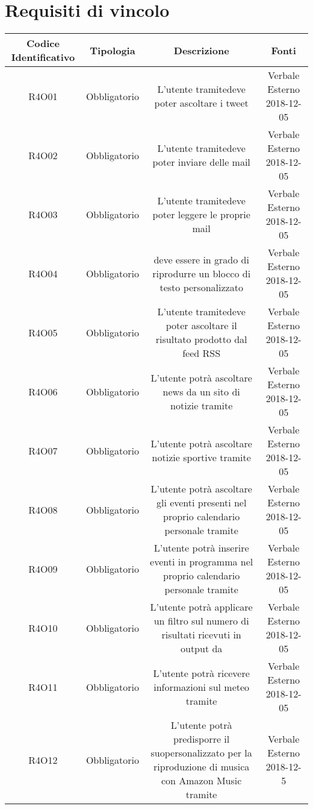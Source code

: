 \section{Requisiti di vincolo}
\begin{tabularx}{\textwidth}{|C|C|C|C|}
	\hline
	\textbf{Codice Identificativo}& \textbf{Tipologia} & \textbf{Descrizione} & \textbf{Fonti}\\
	\hline	
	\endhead
	R4O01&Obbligatorio  &L'utente tramitedeve poter ascoltare i tweet & Verbale Esterno 2018-12-05 \\
	\hline
	R4O02&Obbligatorio  &L'utente tramitedeve poter inviare delle mail & Verbale Esterno 2018-12-05 \\
	\hline
	R4O03&Obbligatorio  &L'utente tramitedeve poter leggere le proprie mail & Verbale Esterno 2018-12-05 \\
	\hline
	R4O04&Obbligatorio  & deve essere in grado di riprodurre un blocco di testo personalizzato & Verbale Esterno 2018-12-05 \\
	\hline
	R4O05&Obbligatorio  &L'utente tramitedeve poter ascoltare il risultato prodotto dal feed RSS & Verbale Esterno 2018-12-05 \\
	\hline
	R4O06 &Obbligatorio& L'utente potrà ascoltare news da un sito di notizie tramite &Verbale Esterno 2018-12-05\\
	\hline
	R4O07 &Obbligatorio& L'utente potrà ascoltare notizie sportive tramite &Verbale Esterno 2018-12-05\\
	\hline
	R4O08 &Obbligatorio&L'utente potrà ascoltare gli eventi presenti nel proprio calendario personale tramite  &Verbale Esterno 2018-12-05\\
	\hline
	R4O09 &Obbligatorio& L'utente potrà inserire eventi in programma nel proprio calendario personale  tramite& Verbale Esterno 2018-12-05\\
	\hline
	R4O10 &Obbligatorio &L'utente potrà applicare un filtro sul numero di risultati ricevuti in output da &Verbale Esterno 2018-12-05\\
	\hline
	R4O11 &Obbligatorio &L'utente potrà ricevere informazioni sul meteo tramite & Verbale Esterno 2018-12-05\\
	\hline
	R4O12&Obbligatorio&L'utente potrà predisporre il suopersonalizzato per la riproduzione di musica con Amazon Music tramite& Verbale Esterno 2018-12-5 \\

\end{tabularx}
